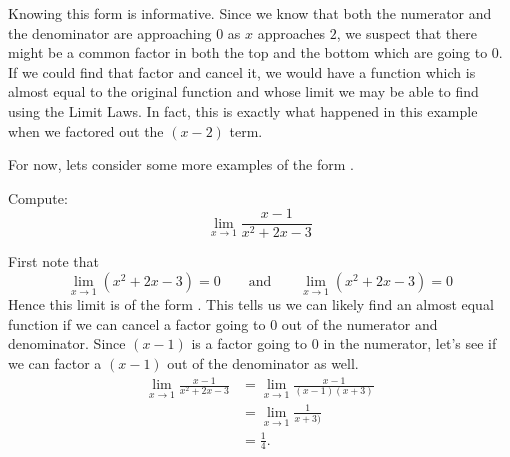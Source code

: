 \documentclass{ximera}
\begin{document}
Knowing this form is informative.  Since we know that both the
numerator and the denominator are approaching $0$ as $x$ approaches
$2$, we suspect that there might be a common factor in both the top
and the bottom which are going to $0$.  If we could find that factor
and cancel it, we would have a function which is almost equal to the
original function and whose limit we may be able to find using the
Limit Laws.  In fact, this is exactly what happened in this example
when we factored out the $(x-2)$ term.

For now, lets consider some more examples of the form \zeroOverZero.

\begin{example}
  Compute:
  \[
  \lim_{x\to1}\frac{x-1}{x^2+2x-3}
  \]
  \begin{explanation}
    First note that
    \[
    \lim_{x\to1}\left(x^2+2x-3\right)=0 \qquad\text{and}\qquad  \lim_{x\to1}\left(x^2+2x-3\right) = 0
    \]
    Hence this limit is of the form \zeroOverZero.  This tells us we
    can likely find an almost equal function if we can cancel a factor
    going to $0$ out of the numerator and denominator.  Since $(x-1)$
    is a factor going to $0$ in the numerator, let's see if we can
    factor a $(x-1)$ out of the denominator as well.
    \begin{align*}
      \lim_{x\to1}\frac{x-1}{x^2+2x-3}&=\lim_{x\to1}\frac{x-1}{(x-1)(x+3)} \\
      &=\lim_{x\to1}\frac{1}{x+3)}\\
      &=\frac{1}{4}.
    \end{align*}
  \end{explanation}
\end{example}

\end{document}
